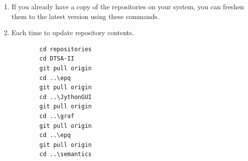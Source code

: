 \documentclass{article}
\begin{document}
\begin{enumerate}
    \begin{enumerate}
        \item You will be able to download \verb|DTSA-II| and \verb|epq| packages without logging into GitHub because they are public projects.
        \item You will need to create an "Access Token" on \url{https://gitlab.nist.gov}.  Log into GitLab using your PIV card.  Click on the icon representing your settings on the top-right of the left most panel on the home page and select the ``Preferences'' menu item. This will replace the left panel with a menu containing an ``Access token'' item.  Select it.  Select the ``Add new token'' button and create a new token with ``api'' and ``read\_user`` privileges.  When you first attempt to download a repository from GitLab (line \ref{clone_graf} below) you will be asked for credentials.  Provide your long NIST email address and paste the token into the Token box.
        \item \verb|md repositories|
        \item \verb|cd repositories|
        \item \verb|git clone https://github.com/usnistgov/DTSA-II |
        \item \verb|git clone https://github.com/usnistgov/epq|
        \item \verb|git clone https://gitlab.nist.gov/gitlab/nritchie/graf|
        \label{clone_graf}
        \item \verb|git clone https://github.com/usnistgov/JythonGUI|
        \item \verb|git clone https://gitlab.nist.gov/gitlab/nritchie/nist-glass-database|
        \item \verb|git clone https://gitlab.nist.gov/gitlab/nritchie/semantics|
        \item \verb|git clone https://gitlab.nist.gov/gitlab/nritchie/fastquant|
    \end{enumerate}
    \item If you already have a copy of the repositories on your system, you can freshen them to the latest version using these commands.
    \item Each time to update repository contents.
    \begin{verbatim}
        cd repositories
        cd DTSA-II
        git pull origin
        cd ..\epq
        git pull origin
        cd ..\JythonGUI
        git pull origin
        cd ..\graf
        git pull origin
        cd ..\epq
        git pull origin
        cd ..\semantics

\end{verbatim}
\end{enumerate}
\end{document}
